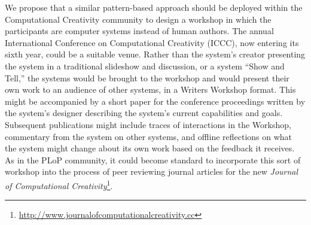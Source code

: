 \documentclass{llncs}
\begin{document}
We propose that a similar pattern-based approach should be deployed
within the Computational Creativity community to design a workshop in
which the participants are computer systems instead of human authors.
The annual International Conference on Computational Creativity
(ICCC), now entering its sixth year, could be a suitable venue.
Rather than the system's creator presenting the system in a
traditional slideshow and discussion, or a system ``Show and Tell,''
the systems would be brought to the workshop and would present their
own work to an audience of other systems, in a Writers Workshop
format.  This might be accompanied by a short paper for the conference
proceedings written by the system's designer describing the system's
current capabilities and goals.  Subsequent publications might include
traces of interactions in the Workshop, commentary from the system on
other systems, and offline reflections on what the system might change
about its own work based on the feedback it receives.  As in the PLoP
community, it could become standard to incorporate this sort of workshop
into the process of peer reviewing journal articles for the new \emph{Journal of
  Computational Creativity}\footnote{\url{http://www.journalofcomputationalcreativity.cc}}.
\end{document}
